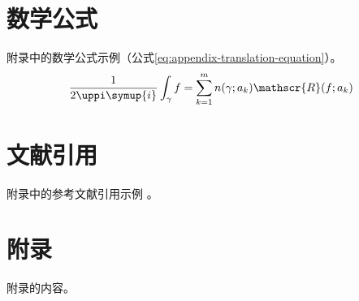 \begin{translation}
\section{数学公式}


附录中的数学公式示例（公式\eqref{eq:appendix-translation-equation}）。
\begin{equation}
  \frac{1}{2 \uppi \symup{i}} \int_\gamma f = \sum_{k=1}^m n(\gamma; a_k) \mathscr{R}(f; a_k)
  \label{eq:appendix-translation-equation}
\end{equation}

\section{文献引用}


附录\cite{dupont1974bone}中的参考文献引用\cite{merkt1995rotational}示例
\cite{dupont1974bone,merkt1995rotational}。

\appendix

\section{附录}


附录的内容。


% 

\printbibliography

\begin{translation-index}
  \nocite{mellinger1996laser}
  \nocite{bixon1996dynamics}
  \nocite{carlson1981two}
  
  \printbibliography
\end{translation-index}

\end{translation}
